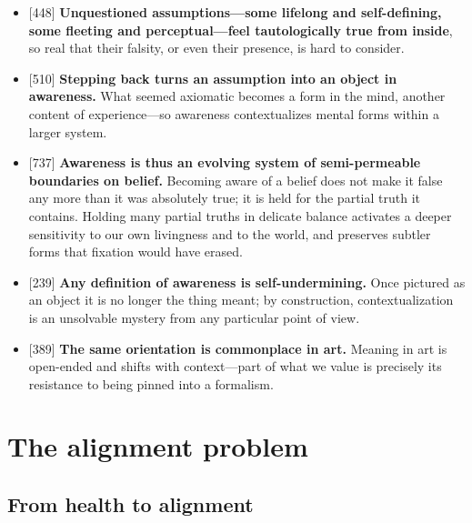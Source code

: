 \documentclass[11pt]{article}
\newcommand{\ct}[1]{{\footnotesize\color{black!55}[#1]}\hspace{1pt}}
\begin{document}
\begin{itemize}
  \item \ct{448} \textbf{Unquestioned assumptions---some lifelong and self-defining, some fleeting and perceptual---feel tautologically true from inside}, so real that their falsity, or even their presence, is hard to consider.
  \item \ct{510} \textbf{Stepping back turns an assumption into an object in awareness.} What seemed axiomatic becomes a form in the mind, another content of experience---so awareness contextualizes mental forms within a larger system.
  \item \ct{737} \textbf{Awareness is thus an evolving system of semi-permeable boundaries on belief.} Becoming aware of a belief does not make it false any more than it was absolutely true; it is held for the partial truth it contains. Holding many partial truths in delicate balance activates a deeper sensitivity to our own livingness and to the world, and preserves subtler forms that fixation would have erased.
  \item \ct{239} \textbf{Any definition of awareness is self-undermining.} Once pictured as an object it is no longer the thing meant; by construction, contextualization is an unsolvable mystery from any particular point of view.
  \item \ct{389} \textbf{The same orientation is commonplace in art.} Meaning in art is open-ended and shifts with context---part of what we value is precisely its resistance to being pinned into a formalism.
\end{itemize}


\section{The alignment problem}

\subsection*{From health to alignment}
\end{document}
